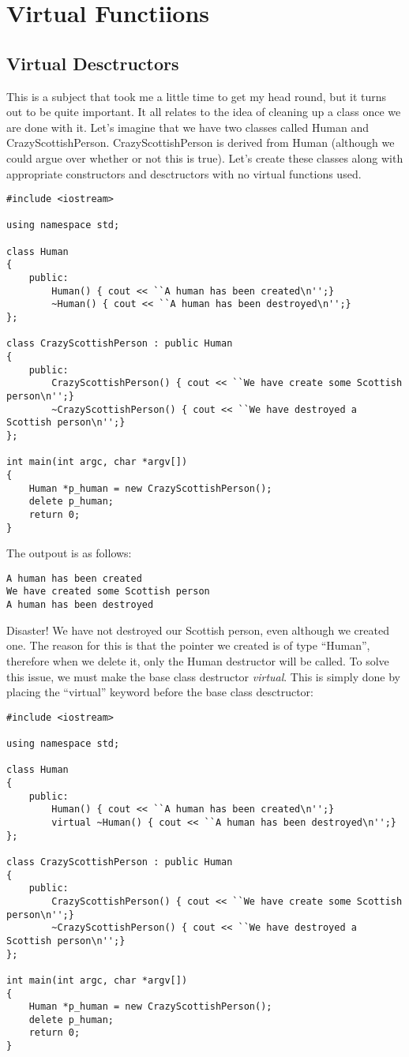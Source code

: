 \section{Virtual Functiions}

\subsection{Virtual Desctructors}

This is a subject that took me a little time to get my head round, but it turns out to be quite important. It all relates to the idea of cleaning up a class once we are done with it. Let's  imagine that we have two classes called Human and CrazyScottishPerson. CrazyScottishPerson is derived from Human (although we could argue over whether or not this is true).  Let's create these classes along with appropriate constructors and desctructors with no virtual functions used.
\begin{verbatim}
#include <iostream>

using namespace std;

class Human
{
	public:
		Human() { cout << ``A human has been created\n'';}
		~Human() { cout << ``A human has been destroyed\n'';}		
};

class CrazyScottishPerson : public Human
{
	public:
		CrazyScottishPerson() { cout << ``We have create some Scottish person\n'';}
		~CrazyScottishPerson() { cout << ``We have destroyed a Scottish person\n'';}
};

int main(int argc, char *argv[])
{
	Human *p_human = new CrazyScottishPerson();
	delete p_human;
	return 0;
}
\end{verbatim}
The outpout is as follows:
\begin{verbatim}
A human has been created
We have created some Scottish person
A human has been destroyed
\end{verbatim}
Disaster! We have not destroyed our Scottish person, even although we created one. The reason for this is that the pointer we created is of type ``Human'', therefore when we delete it, only the Human destructor will be called. To solve this issue, we must make the base class destructor \emph{virtual}. This is simply done by placing the ``virtual'' keyword before the base class desctructor:
\begin{verbatim}
#include <iostream>

using namespace std;

class Human
{
	public:
		Human() { cout << ``A human has been created\n'';}
		virtual ~Human() { cout << ``A human has been destroyed\n'';}		
};

class CrazyScottishPerson : public Human
{
	public:
		CrazyScottishPerson() { cout << ``We have create some Scottish person\n'';}
		~CrazyScottishPerson() { cout << ``We have destroyed a Scottish person\n'';}
};

int main(int argc, char *argv[])
{
	Human *p_human = new CrazyScottishPerson();
	delete p_human;
	return 0;
}
\end{verbatim}

